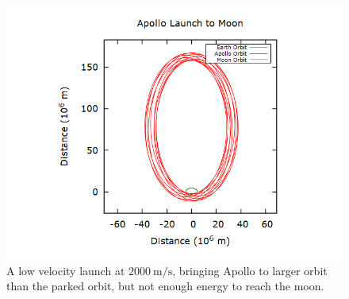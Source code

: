 \documentclass[aps,prl,twocolumn,superscriptaddress]{revtex4-1}
\begin{document}
\begin{figure}[htbp]
  	\begin{center}
 		\includegraphics[scale=0.3]{1.png}
  		\caption{A low velocity launch at $\SI{2000}{\m\per\s}$, bringing Apollo to larger orbit than the parked orbit, but not enough energy to reach the moon.}
  		\label{gr:smalllaunch}
 	\end{center}
\end{figure}
\end{document}
